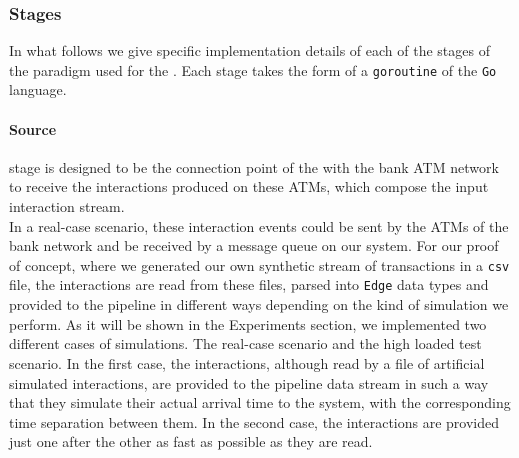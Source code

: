 \subsubsection*{Stages}
In what follows we give specific implementation details of each of the stages of the \DP paradigm used for the \DPATM. Each stage takes the form of a \texttt{goroutine} of the \texttt{Go} language.

\paragraph*{Source\\ }


\source stage is designed to be the connection point of the \DPATM with the bank ATM network to receive the interactions produced on these ATMs, which compose the input interaction stream.\\

In a real-case scenario, these interaction events could be sent by the ATMs of the bank network and be received by a message queue on our \DPATM system. For our proof of concept, where we generated our own synthetic stream of transactions in a \texttt{csv} file,
the interactions are read from these files, parsed into \texttt{Edge} data types and provided to the pipeline in different ways depending on the kind of simulation we perform. As it will be shown in the Experiments section, we implemented two different cases of simulations. The real-case scenario and the high loaded test scenario. In the first case, the interactions, although read by a file of artificial simulated interactions, are provided to the pipeline data stream in such a way that they simulate their actual arrival time to the system, with the corresponding time separation between them. In the second case, the interactions are provided just one after the other as fast as possible as they are read.\\

